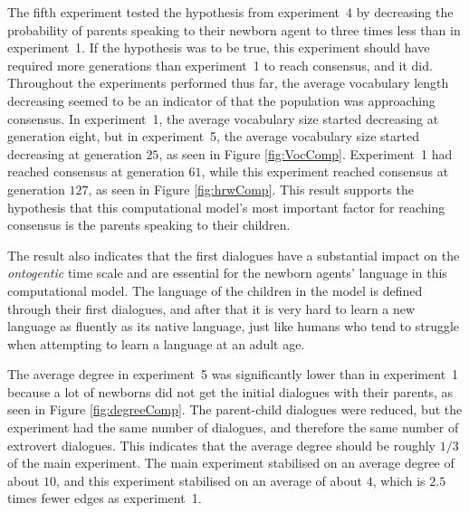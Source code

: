 The fifth experiment tested the hypothesis from experiment~4 by decreasing the probability of parents speaking to their newborn agent to three times less than in experiment~1. If the hypothesis was to be true, this experiment should have required more generations than experiment~1 to reach consensus, and it did. Throughout the experiments performed thus far, the average vocabulary length decreasing seemed to be an indicator of that the population was approaching consensus. In experiment~1, the average vocabulary size started decreasing at generation eight, but in experiment~5, the average vocabulary size started decreasing at generation $25$, as seen in Figure \ref{fig:VocComp}. Experiment~1 had reached consensus at generation $61$, while this experiment reached consensus at generation $127$, as seen in Figure \ref{fig:hrwComp}. This result supports the hypothesis that this computational model's most important factor for reaching consensus is the parents speaking to their children. 

The result also indicates that the first dialogues have a substantial impact on the \textit{ontogentic} time scale and are essential for the newborn agents' language in this computational model. The language of the children in the model is defined through their first dialogues, and after that it is very hard to learn a new language as fluently as its native language, just like humans who tend to struggle when attempting to learn a language at an adult age. 

The average degree in experiment~5 was significantly lower than in experiment~1 because a lot of newborns did not get the initial dialogues with their parents, as seen in Figure \ref{fig:degreeComp}. The parent-child dialogues were reduced, but the experiment had the same number of dialogues, and therefore the same number of extrovert dialogues. This indicates that the average degree should be roughly $1/3$ of the main experiment. The main experiment stabilised on an average degree of about $10$, and this experiment stabilised on an average of about $4$, which is $2.5$ times fewer edges as experiment~1. 


